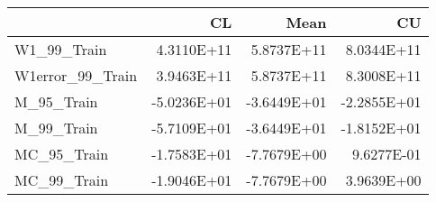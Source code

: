 \begin{tabular}{lrrr}
\toprule
{} &          CL &        Mean &          CU \\
\midrule
W1\_99\_Train      &  4.3110E+11 &  5.8737E+11 &  8.0344E+11 \\
W1error\_99\_Train &  3.9463E+11 &  5.8737E+11 &  8.3008E+11 \\
M\_95\_Train       & -5.0236E+01 & -3.6449E+01 & -2.2855E+01 \\
M\_99\_Train       & -5.7109E+01 & -3.6449E+01 & -1.8152E+01 \\
MC\_95\_Train      & -1.7583E+01 & -7.7679E+00 &  9.6277E-01 \\
MC\_99\_Train      & -1.9046E+01 & -7.7679E+00 &  3.9639E+00 \\
\bottomrule
\end{tabular}
